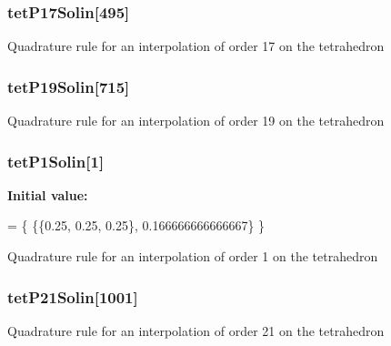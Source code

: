 \subsubsection[{tet\-P17\-Solin}]{ tet\-P17\-Solin[495]}\label{GaussQuadratureTet_8cc_ab69bb8e66fa3906fc5a6d861176e461d}
Quadrature rule for an interpolation of order 17 on the tetrahedron 
\subsubsection[{tet\-P19\-Solin}]{ tet\-P19\-Solin[715]}\label{GaussQuadratureTet_8cc_abd0326569210df9830b9e585be4f47b2}
Quadrature rule for an interpolation of order 19 on the tetrahedron 
\subsubsection[{tet\-P1\-Solin}]{ tet\-P1\-Solin[1]}\label{GaussQuadratureTet_8cc_ad13ff8bd279415feb5d1f2e59fa7be04}
{\bfseries Initial value\-:}
\begin{DoxyCode}
= \{
  \{\{0.25, 0.25, 0.25\}, 0.166666666666667\}
\}
\end{DoxyCode}
Quadrature rule for an interpolation of order 1 on the tetrahedron 
\subsubsection[{tet\-P21\-Solin}]{ tet\-P21\-Solin[1001]}\label{GaussQuadratureTet_8cc_a2dbbec6a13c023157cbfca4b118e43bb}
Quadrature rule for an interpolation of order 21 on the tetrahedron 
